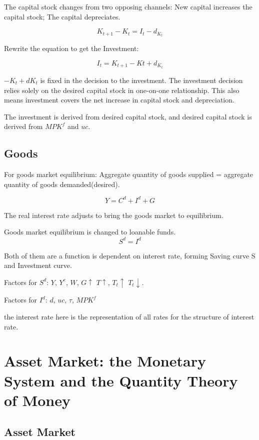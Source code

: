 \documentclass[10pt, a4paper]{article}
\begin{document}
                The capital stock changes from two opposing channels: New capital increases the capital stock; The capital depreciates. 

                $$K_{t + 1} - K_{t} = I_t - d_{K_t}$$

                Rewrite the equation to get the Investment: 

                $$I_t = K_{t + 1} - K{t} + d_{K_t}$$

                $-K_t + d{K_t}$ is fixed in the decision to the investment. The investment decision relies solely on the desired capital stock in one-on-one relationship. This also means investment covers the net increase in capital stock and depreciation.
                
                The investment is derived from desired capital stock, and desired capital stock is derived from $MPK^f$ and $uc$.  
        \subsection{Goods}
            For goods market equilibrium: Aggregate quantity of goods supplied = aggregate quantity of goods demanded(desired).
            
            $$Y = C^d + I^d + G$$

            The real interest rate adjusts to bring the goods market to equilibrium.


            Goods market equilibrium is changed to loanable funds. 
            $$S^d = I^d$$

            Both of them are a function is dependent on interest rate, forming Saving curve S and Investment curve. 

            Factors for $S^d$: $Y$, $Y^e$, $W$, $G \uparrow$ $T \uparrow$, $T_t \uparrow$ $T_t \downarrow$.

            Factors for $I^d$: $d$, $uc$, $\tau$, $MPK^f$

            the interest rate here is the representation of all rates for the structure of interest rate. 

    \section{Asset Market: the Monetary System and the Quantity Theory of Money}
        \subsection{Asset Market}
\end{document}
